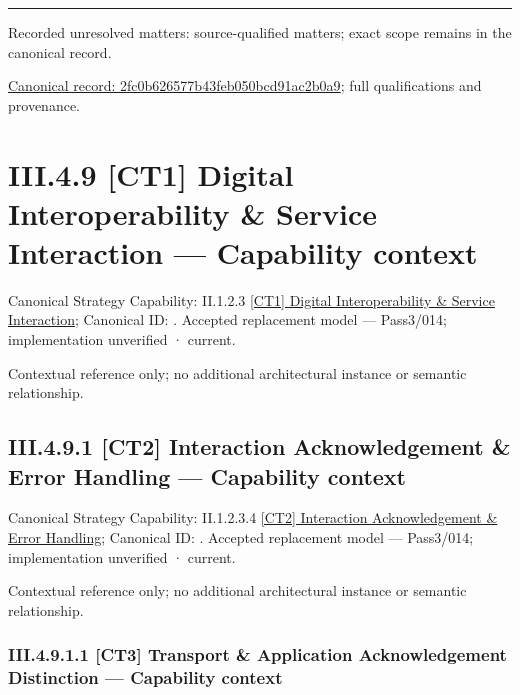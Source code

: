 \medskip\hrule\medskip

{\small Recorded unresolved matters: source-qualified matters; exact scope remains in the canonical record.}\par
{\footnotesize \href{../../../../../../../continuum/business/business-process/2fc0b626577b43feb050bcd91ac2b0a9.md}{Canonical record: 2fc0b626577b43feb050bcd91ac2b0a9}; full qualifications and provenance.}\par
\section*{III.4.9 [CT1] Digital Interoperability \& Service Interaction — Capability context}
\label{navigation:III.4.9}

{\small Canonical Strategy Capability: II.1.2.3 \hyperref[element:2d94913dccc24c19804b426921f49a6b]{[CT1] Digital Interoperability \& Service Interaction}; Canonical ID: \texttt{}. Accepted replacement model — Pass3/014; implementation unverified · current.}\par
Contextual reference only; no additional architectural instance or semantic relationship.\par
\subsection*{III.4.9.1 [CT2] Interaction Acknowledgement \& Error Handling — Capability context}
\label{navigation:III.4.9.1}

{\small Canonical Strategy Capability: II.1.2.3.4 \hyperref[element:8bbc1201d917421ba7597aa341e850b6]{[CT2] Interaction Acknowledgement \& Error Handling}; Canonical ID: \texttt{}. Accepted replacement model — Pass3/014; implementation unverified · current.}\par
Contextual reference only; no additional architectural instance or semantic relationship.\par
\subsubsection*{III.4.9.1.1 [CT3] Transport \& Application Acknowledgement Distinction — Capability context}
\label{navigation:III.4.9.1.1}


